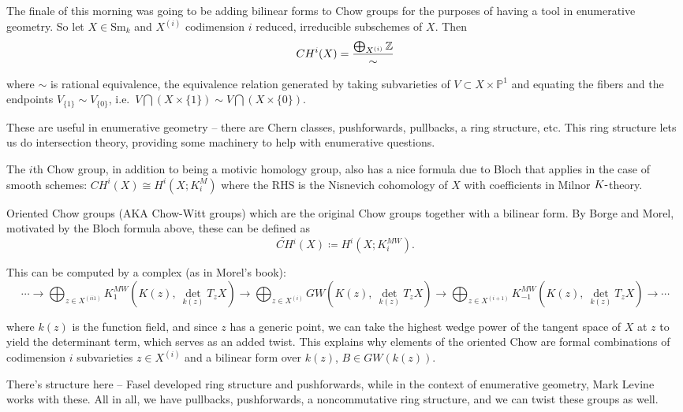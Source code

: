 \documentclass[11pt]{scrreprt}
\theoremstyle{definition}
\newcommand{\ZZ}[0]{{\mathbb{Z}}}
\newcommand{\PP}[0]{{\mathbb{P}}}
\newcommand{\theset}[1]{\{{#1}\}}
\newcommand{\intersect}[0]{\bigcap}
\newcommand{\dash}[0]{{\hbox{-}}}
\newcommand{\Sm}[0]{{\text{Sm}_k}}
\newcommand{\cross}[0]{\times}
\newcommand{\definedas}[0]{\coloneqq}
\begin{document}
The finale of this morning was going to be adding bilinear forms to Chow
groups for the purposes of having a tool in enumerative geometry. So let
\(X\in\Sm\) and \(X^{(i)}\) codimension \(i\) reduced, irreducible
subschemes of \(X\). Then \[
CH^i(X) = {\bigoplus_{X^{(i)}} \ZZ \over \sim}
\]

where \(\sim\) is rational equivalence, the equivalence relation
generated by taking subvarieties of \(V\subset X\cross \PP^1\) and
equating the fibers and the endpoints
\(V_{\theset{1}} \sim V_{\theset{0}}\),
i.e.~\(V\intersect (X\cross\theset{1}) \sim V\intersect (X\cross\theset{0})\).

These are useful in enumerative geometry -- there are Chern classes,
pushforwards, pullbacks, a ring structure, etc. This ring structure lets
us do intersection theory, providing some machinery to help with
enumerative questions.

The \(i\)th Chow group, in addition to being a motivic homology group,
also has a nice formula due to Bloch that applies in the case of smooth
schemes: \(CH^i(X) \cong H^i(X; K^{M}_i)\) where the RHS is the
Nisnevich cohomology of \(X\) with coefficients in Milnor
\(K\dash\)theory.

Oriented Chow groups (AKA Chow-Witt groups) which are the original Chow
groups together with a bilinear form. By Borge and Morel, motivated by
the Bloch formula above, these can be defined as \[
\widetilde{CH}{}^i(X) \definedas H^i(X; K_i^{MW}).
\]

This can be computed by a complex (as in Morel's book): \[
\cdots \to \bigoplus_{z\in X^{(ii1)}} K^{MW}_{1}(K(z), ~\det_{k(z)} T_z X) \to \bigoplus_{z\in X^{(i)}} GW(K(z), ~\det_{k(z)} T_z X)  \to \bigoplus_{z\in X^{(i+1)}} K^{MW}_{-1}(K(z), ~\det_{k(z)} T_z X)  \to \cdots
\]

where \(k(z)\) is the function field, and since \(z\) has a generic
point, we can take the highest wedge power of the tangent space of \(X\)
at \(z\) to yield the determinant term, which serves as an added twist.
This explains why elements of the oriented Chow are formal combinations
of codimension \(i\) subvarieties \(z\in X^{(i)}\) and a bilinear form
over \(k(z)\), \(B\in GW(k(z))\).

There's structure here -- Fasel developed ring structure and
pushforwards, while in the context of enumerative geometry, Mark Levine
works with these. All in all, we have pullbacks, pushforwards, a
noncommutative ring structure, and we can twist these groups as well.
\end{document}
